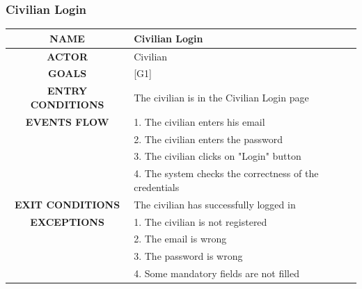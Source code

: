 \documentclass[12pt,a4paper]{article}
\begin{document}
\subsubsection{Civilian Login}
		\begin{center}
			\begin{tabular}{| c | l |}
				\hline
				\textbf{NAME} & Civilian Login \\
				\hline
				\textbf{ACTOR} & Civilian \\
				\hline
				\textbf{GOALS} & [G1] \\
				\hline
				\textbf{ENTRY CONDITIONS} & The civilian is in the Civilian Login page \\ \hline
				\textbf{EVENTS FLOW}  &
				1. The civilian enters his email\\
				&2. The civilian enters the password\\
				&3. The civilian clicks on "Login" button\\
				&4. The system checks the correctness of the credentials\\
				\hline
				\textbf{EXIT CONDITIONS}  & The civilian has successfully logged in \\ \hline
				\textbf{EXCEPTIONS} &
				1. The civilian is not registered\\
				&2. The email is wrong\\
				&3. The password is wrong\\
				&4. Some mandatory fields are not filled\\
				\hline
			\end{tabular}
		\end{center}
\end{document}
